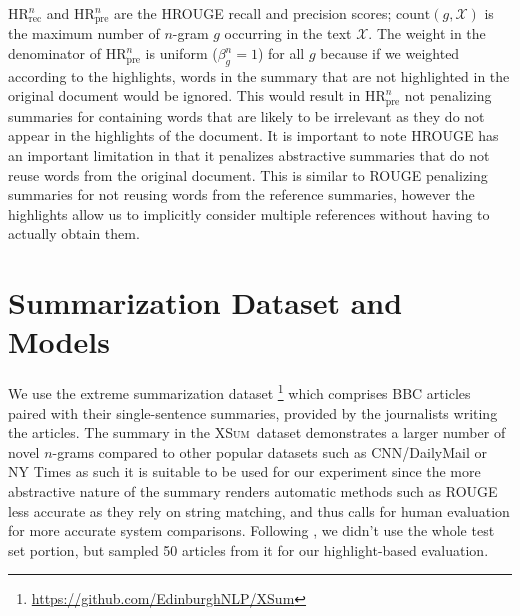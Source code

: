 \documentclass[11pt,a4paper]{article}
\newcommand\xsum{\textsc{XSum}}
\newcommand\hrouge{\textsc{HROUGE}}
\newcommand\rouge{\textsc{ROUGE}}
\begin{document}
\noindent $\text{HR}_{\mathrm{rec}}^n$ and $\text{HR}_{\mathrm{pre}}^n$ are the HROUGE recall and precision scores; $\text{count}(g, \mathcal{X})$ is the maximum number of $n$-gram $g$ occurring in the text $\mathcal{X}$. The weight in the denominator of $\text{HR}_{\mathrm{pre}}^n$ is uniform ($\beta^n_g = 1$) for all $g$ because if we weighted according to the highlights, words in the summary that are not highlighted in the original document would be ignored. This would result in $\text{HR}_{\mathrm{pre}}^n$ not penalizing summaries for containing words that are likely to be irrelevant as they do not appear in the highlights of the document.
It is important to note \hrouge{} has an important limitation in that it penalizes abstractive summaries that do not reuse words from the original document. This is similar to \rouge{} penalizing summaries for not reusing words from the reference summaries, however the highlights allow us to implicitly consider multiple references without having to actually obtain them.  %

\section{Summarization Dataset and Models}
\label{sec:data-models}

We use the extreme summarization dataset \citep[\xsum,][]{narayan18xsum}\footnote{\url{https://github.com/EdinburghNLP/XSum}} which comprises BBC articles paired with their single-sentence summaries, provided by the journalists writing the articles. The summary in the \xsum\ dataset demonstrates a larger number of novel $n$-grams compared to other popular datasets such as CNN/DailyMail \citep{Hermann2015} or NY Times \citep{Sandhaus2008} as such it is suitable to be used for our experiment since the more abstractive nature of the summary renders automatic methods such as ROUGE less accurate as they rely on string matching, and thus calls for human evaluation for more accurate system comparisons. 
Following \citet{narayan18xsum}, we didn't use the whole test set portion, but sampled 50 articles from it for our highlight-based evaluation.  
\end{document}
